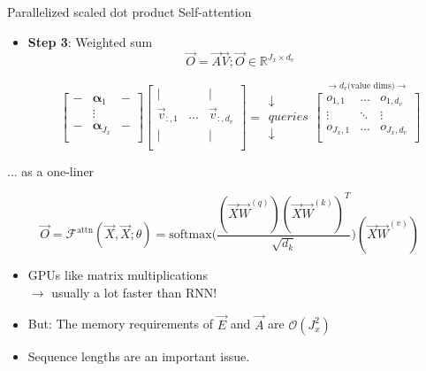 
\begin{vbframe}{Parallelized scaled dot product Self-attention}

\vfill

\begin{itemize}
\item \textbf{Step 3}: Weighted sum
$$\vec {O} = \vec {A} \vec {V}; \vec O \in \mathbb{R}^{J_x \times d_v}$$

$$
\begin{bmatrix} 
- & \boldsymbol \alpha_1  & -  \\
& \vdots & \\
-  & \boldsymbol \alpha_{J_x}  &  -  \\
\end{bmatrix}  
\begin{bmatrix} 
\lvert &  & \lvert  \\
\vec {v}_{:,1} & \ldots & \vec {v}_{:,d_v} \\
\lvert &  & \lvert  \\
\end{bmatrix}
=
\begin{matrix} \downarrow \\ queries \\ \downarrow \end{matrix}
	\overset{\rightarrow d_v \text{(value dims)} \rightarrow}{
\begin{bmatrix}
o_{1,1} & \ldots & o_{1,d_v} \\
\vdots & \ddots & \vdots \\
o_{J_x,1} & \ldots & o_{J_x,d_v} \\
\end{bmatrix}}
$$
\end{itemize}

\vfill

\end{vbframe}


\begin{vbframe}{... as a one-liner}

\vfill

\large
$$ \vec O = \mathcal{F}^\mathrm{attn}(\vec X, \vec X; \theta) = \mathrm{softmax}\Big(\frac{(\vec X\vec W^{(q)} ) (\vec X\vec W^{(k)} )^T}{\sqrt{d_k}}\Big)(\vec X\vec W^{(v)} ) $$
\begin{itemize}
\item GPUs like matrix multiplications\\$\rightarrow$ usually a lot faster than RNN!
\item But: The memory requirements of $\vec E$ and $\vec A$ are $\mathcal{O}(J_x^2)$
\item Sequence lengths are an important issue.
\end{itemize}

\vfill

\end{vbframe}

